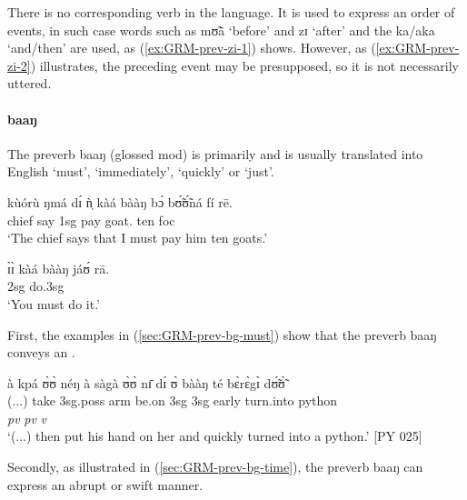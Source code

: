 \begin{exe}
\begin{exe}
\begin{exe}
\begin{exe}
\begin{exe}
\begin{exe}
\begin{exe}
\begin{exe}
\begin{exe}
\begin{exe}
\begin{exe}
\begin{exe}
\z 
 \z


There is no corresponding verb in the language.   It is used to express an 
order of events,  in such case words such as {\sls mʊ̃ã}  `before' and {\sls 
zɪ} `after' and the  {\sls ka/aka}  `and/then' are used, as 
(\ref{ex:GRM-prev-zi-1}) shows. However,  as (\ref{ex:GRM-prev-zi-2}) 
illustrates,  the preceding event may be presupposed, so  it is not necessarily 
uttered.







\paragraph{baaŋ}
\label{sec:GRM-preverb-baang}

 The preverb  {\sls baaŋ}  (glossed {\sc mod})  is primarily  and is  
usually translated into English `must', `immediately', `quickly'  or `just'. 


\ea\label{sec:GRM-prev-bg-must}
\ea\label{ex:GRM-7.17}
\gll  kùórù ŋmá dɪ́ ǹ̩ kàá bààŋ bɔ́ bʊ̃́ʊ̃́ná  fí rē.\\
 chief say {\comp} {\sc 1sg} {\fut} {\mod}   pay  goat.{\pl} ten {\sc foc}\\
\glt  `The chief says that I must pay him ten goats.' 

\ex\label{ex:GRM-14.3}
\gll  ɪ̀ɪ̀ kàá bààŋ jáʊ́ rā.\\
{\sc 2sg} {\fut} {\mod} do.{\sc 3sg} {\foc}\\
\glt  `You must do it.'

 \z 
 \z
 
First, the examples in (\ref{sec:GRM-prev-bg-must}) show that  the preverb  
{\sls baaŋ} conveys an .


\ea\label{sec:GRM-prev-bg-time}
 à kpá ʊ̀ʊ̀ néŋ à sàgà ʊ̀ʊ̀ nɪ̄ dɪ́ ʊ̀ bààŋ té 
bɛ̀rɛ̀gɪ̀ dʊ̃́ʊ̃̀\\
  {(...})  {\conn}  take {\sc 3sg.poss} arm {\conn} {be.on} {\sc
3sg}  {\postp} {\conn} {\sc 3sg} {\mod} {early} turn.into python\\
{} {} {} {} {} {} {} {} {} {} {} {\it pv} {\it pv} {\it v} {}\\

\glt  `(...) then put his hand on her  and quickly turned into
a python.' [PY 025]
\z
   
   Secondly, as illustrated in (\ref{sec:GRM-prev-bg-time}),  the preverb  
{\sls baaŋ} can express an  abrupt or
swift   manner. 


\end{exe}
\end{exe}
\end{exe}
\end{exe}
\end{exe}
\end{exe}
\end{exe}
\end{exe}
\end{exe}
\end{exe}
\end{exe}
\end{exe}
